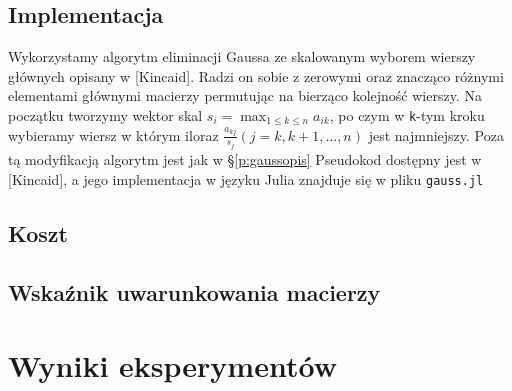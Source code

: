 \documentclass[11pt,wide]{mwart}
\begin{document}
\subsection{Implementacja}
Wykorzystamy algorytm eliminacji Gaussa ze skalowanym wyborem wierszy głównych opisany w [Kincaid]. Radzi on sobie z zerowymi oraz znacząco różnymi elementami głównymi macierzy permutując na bierząco kolejność wierszy. Na początku tworzymy wektor skal $ s_i = \max_{1 \leq k \leq n}a_{ik} $, po czym w \texttt{k}-tym kroku wybieramy wiersz w którym iloraz $ \frac{a_{kj}}{s_j} (j = k, k+1, \ldots,n)$ jest najmniejszy. Poza tą modyfikacją algorytm jest jak w \S\ref{p:gaussopis} Pseudokod dostępny jest w [Kincaid], a jego implementacja w języku Julia znajduje się w pliku \texttt{gauss.jl}
\subsection{Koszt} \label{SS:gausscost}
\subsection{Wskaźnik uwarunkowania macierzy}
\section{Wyniki eksperymentów}
\end{document}
